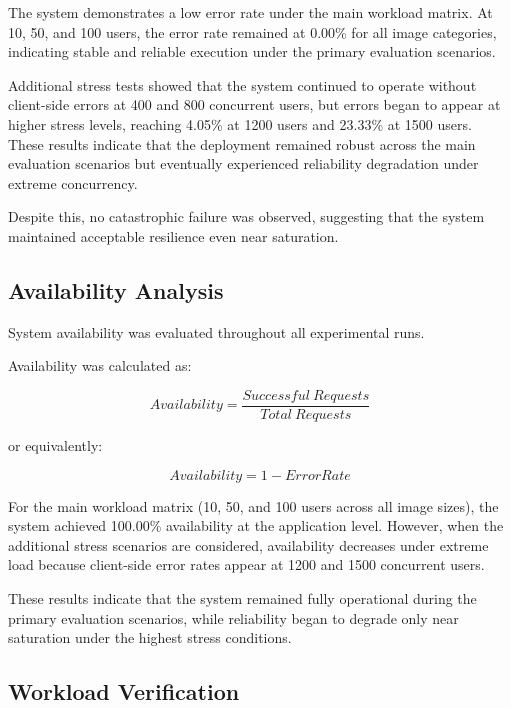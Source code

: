 \documentclass[11pt,a4paper,twocolumn]{article}
\begin{document}
The system demonstrates a low error rate under the main workload matrix. At 10, 50, and 100 users, the error rate remained at 0.00\% for all image categories, indicating stable and reliable execution under the primary evaluation scenarios.

Additional stress tests showed that the system continued to operate without client-side errors at 400 and 800 concurrent users, but errors began to appear at higher stress levels, reaching 4.05\% at 1200 users and 23.33\% at 1500 users. These results indicate that the deployment remained robust across the main evaluation scenarios but eventually experienced reliability degradation under extreme concurrency.

Despite this, no catastrophic failure was observed, suggesting that the system maintained acceptable resilience even near saturation.


\subsection{Availability Analysis}

System availability was evaluated throughout all experimental runs.

Availability was calculated as:

\[
Availability = \frac{Successful\ Requests}{Total\ Requests}
\]

or equivalently:

\[
Availability = 1 - ErrorRate
\]

For the main workload matrix (10, 50, and 100 users across all image sizes), the system achieved 100.00\% availability at the application level. However, when the additional stress scenarios are considered, availability decreases under extreme load because client-side error rates appear at 1200 and 1500 concurrent users.

These results indicate that the system remained fully operational during the primary evaluation scenarios, while reliability began to degrade only near saturation under the highest stress conditions.

\subsection{Workload Verification}
\end{document}
